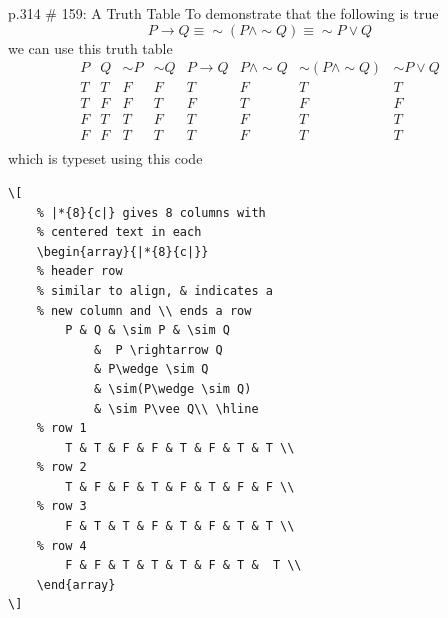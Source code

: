 \documentclass[12pt]{article}
\begin{document}

\begin{problem}{p.314 \# 159: A Truth Table}
    To demonstrate that the following is true 
    \[P\rightarrow Q\equiv \sim (P\wedge \sim Q)\equiv \sim P\vee Q\]
    we can use this truth table
    \[
        \begin{array}{|*{8}{c|}}
            P & Q & \sim P & \sim Q 
                &  P \rightarrow Q 
                & P\wedge \sim Q
                & \sim(P\wedge \sim Q)
                & \sim P\vee Q\\ \hline
            T & T & F & F & T & F & T & T \\
            T & F & F & T & F & T & F & F \\
            F & T & T & F & T & F & T & T \\
            F & F & T & T & T & F & T &  T \\
        \end{array}
    \]
    which is typeset using this code

\begin{verbatim}
\[
    % |*{8}{c|} gives 8 columns with 
    % centered text in each
    \begin{array}{|*{8}{c|}}
    % header row
    % similar to align, & indicates a 
    % new column and \\ ends a row
        P & Q & \sim P & \sim Q 
            &  P \rightarrow Q 
            & P\wedge \sim Q
            & \sim(P\wedge \sim Q)
            & \sim P\vee Q\\ \hline
    % row 1
        T & T & F & F & T & F & T & T \\
    % row 2
        T & F & F & T & F & T & F & F \\
    % row 3
        F & T & T & F & T & F & T & T \\
    % row 4
        F & F & T & T & T & F & T &  T \\
    \end{array}
\]
\end{verbatim}

\end{problem}
\end{document}
